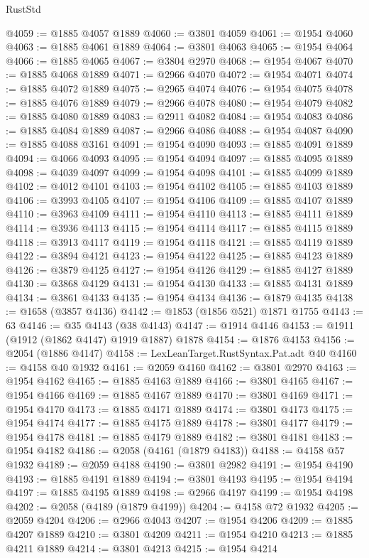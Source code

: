\begin{lexlean}{RustStd}
\begin{coremodule}
@4059 := @1885 @4057 @1889
@4060 := @3801 @4059
@4061 := @1954 @4060
@4063 := @1885 @4061 @1889
@4064 := @3801 @4063
@4065 := @1954 @4064
@4066 := @1885 @4065
@4067 := @3804 @2970
@4068 := @1954 @4067
@4070 := @1885 @4068 @1889
@4071 := @2966 @4070
@4072 := @1954 @4071
@4074 := @1885 @4072 @1889
@4075 := @2965 @4074
@4076 := @1954 @4075
@4078 := @1885 @4076 @1889
@4079 := @2966 @4078
@4080 := @1954 @4079
@4082 := @1885 @4080 @1889
@4083 := @2911 @4082
@4084 := @1954 @4083
@4086 := @1885 @4084 @1889
@4087 := @2966 @4086
@4088 := @1954 @4087
@4090 := @1885 @4088 @3161
@4091 := @1954 @4090
@4093 := @1885 @4091 @1889
@4094 := @4066 @4093
@4095 := @1954 @4094
@4097 := @1885 @4095 @1889
@4098 := @4039 @4097
@4099 := @1954 @4098
@4101 := @1885 @4099 @1889
@4102 := @4012 @4101
@4103 := @1954 @4102
@4105 := @1885 @4103 @1889
@4106 := @3993 @4105
@4107 := @1954 @4106
@4109 := @1885 @4107 @1889
@4110 := @3963 @4109
@4111 := @1954 @4110
@4113 := @1885 @4111 @1889
@4114 := @3936 @4113
@4115 := @1954 @4114
@4117 := @1885 @4115 @1889
@4118 := @3913 @4117
@4119 := @1954 @4118
@4121 := @1885 @4119 @1889
@4122 := @3894 @4121
@4123 := @1954 @4122
@4125 := @1885 @4123 @1889
@4126 := @3879 @4125
@4127 := @1954 @4126
@4129 := @1885 @4127 @1889
@4130 := @3868 @4129
@4131 := @1954 @4130
@4133 := @1885 @4131 @1889
@4134 := @3861 @4133
@4135 := @1954 @4134
@4136 := @1879 @4135
@4138 := @1658 (@3857 @4136)
@4142 := @1853 (@1856 @521) @1871 @1755
@4143 := 63
@4146 := @35 @4143 (@38 @4143)
@4147 := @1914 @4146
@4153 := @1911 (@1912 (@1862 @4147) @1919 @1887) @1878
@4154 := @1876 @4153
@4156 := @2054 (@1886 @4147)
@4158 := LexLeanTarget.RustSyntax.Pat.adt @40
@4160 := @4158 @40 @1932
@4161 := @2059 @4160
@4162 := @3801 @2970
@4163 := @1954 @4162
@4165 := @1885 @4163 @1889
@4166 := @3801 @4165
@4167 := @1954 @4166
@4169 := @1885 @4167 @1889
@4170 := @3801 @4169
@4171 := @1954 @4170
@4173 := @1885 @4171 @1889
@4174 := @3801 @4173
@4175 := @1954 @4174
@4177 := @1885 @4175 @1889
@4178 := @3801 @4177
@4179 := @1954 @4178
@4181 := @1885 @4179 @1889
@4182 := @3801 @4181
@4183 := @1954 @4182
@4186 := @2058 (@4161 (@1879 @4183))
@4188 := @4158 @57 @1932
@4189 := @2059 @4188
@4190 := @3801 @2982
@4191 := @1954 @4190
@4193 := @1885 @4191 @1889
@4194 := @3801 @4193
@4195 := @1954 @4194
@4197 := @1885 @4195 @1889
@4198 := @2966 @4197
@4199 := @1954 @4198
@4202 := @2058 (@4189 (@1879 @4199))
@4204 := @4158 @72 @1932
@4205 := @2059 @4204
@4206 := @2966 @4043
@4207 := @1954 @4206
@4209 := @1885 @4207 @1889
@4210 := @3801 @4209
@4211 := @1954 @4210
@4213 := @1885 @4211 @1889
@4214 := @3801 @4213
@4215 := @1954 @4214

\end{coremodule}
\end{lexlean}
